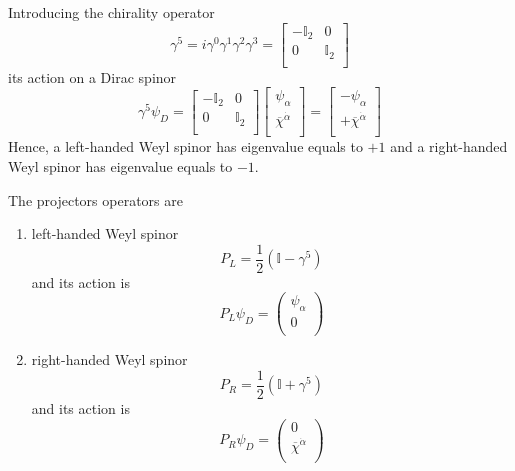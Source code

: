     Introducing the chirality operator
    \begin{equation*}
        \gamma^5 = i \gamma^0 \gamma^1 \gamma^2 \gamma^3 = \begin{bmatrix}
            - \mathbb I_2 & 0 \\
            0 & \mathbb I_2 \\
        \end{bmatrix}
    \end{equation*}
    its action on a Dirac spinor 
    \begin{equation*}
        \gamma^5 \psi_D = \begin{bmatrix}
            - \mathbb I_2 & 0 \\
            0 & \mathbb I_2 \\
        \end{bmatrix} \begin{bmatrix}
            \psi_\alpha \\
            \overline \chi^{\dot \alpha} \\
        \end{bmatrix} = \begin{bmatrix}
            - \psi_\alpha \\
            + \overline \chi^{\dot \alpha} \\
        \end{bmatrix}
    \end{equation*}
    Hence, a left-handed Weyl spinor has eigenvalue equals to $+1$ and a right-handed Weyl spinor has eigenvalue equals to $-1$.

    The projectors operators are 
    \begin{enumerate}
        \item left-handed Weyl spinor 
            \begin{equation*}
                P_L = \frac{1}{2} (\mathbb I - \gamma^5)
            \end{equation*}
              and its action is 
            \begin{equation*}
                P_L \psi_D = \begin{pmatrix}
                    \psi_\alpha \\ 
                    0 \\
                \end{pmatrix}
            \end{equation*}
        \item right-handed Weyl spinor 
            \begin{equation*}
                P_R = \frac{1}{2} (\mathbb I + \gamma^5)
            \end{equation*}
              and its action is 
            \begin{equation*}
                P_R \psi_D = \begin{pmatrix}
                    0 \\ 
                    \overline \chi^{\dot \alpha} \\
                \end{pmatrix}
            \end{equation*}
    \end{enumerate}

